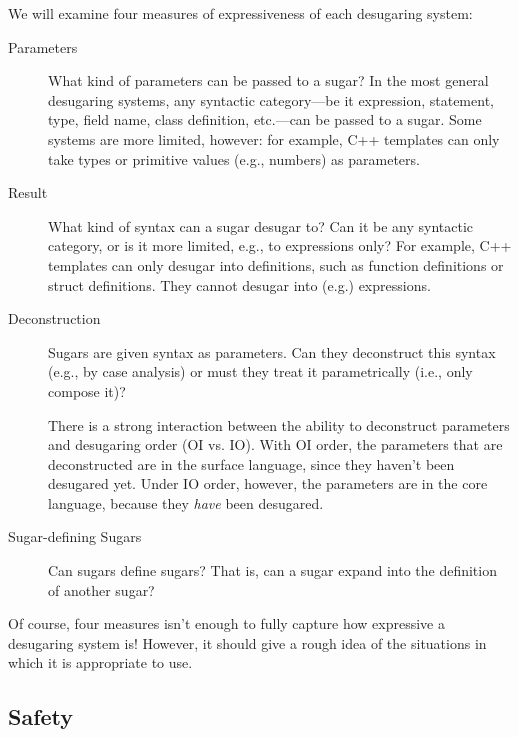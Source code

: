 We will examine four measures of expressiveness of each desugaring
system:
\begin{description}
\item[Parameters] What kind of parameters can be passed to a sugar? In
  the most general desugaring systems, any syntactic category---be it
  expression, statement, type, field name, class definition,
  etc.---can be passed to a sugar. Some systems are more limited,
  however: for example, C++ templates can only take types or primitive
  values (e.g., numbers) as parameters.
\item[Result] What kind of syntax can a sugar desugar to? Can it be
  any syntactic category, or is it more limited, e.g., to expressions
  only? For example, C++ templates can only desugar into definitions,
  such as function definitions or struct definitions. They cannot
  desugar into (e.g.) expressions.
\item[Deconstruction] Sugars are given syntax as parameters. Can they
  deconstruct this syntax (e.g., by case analysis) or must
  they treat it parametrically (i.e., only compose it)?

  There is a strong interaction between the ability to deconstruct
  parameters and desugaring order (OI vs. IO). With OI order, the
  parameters that are deconstructed are in the surface language, since
  they haven't been desugared yet. Under IO order, however, the
  parameters are in the core language, because they \emph{have} been
  desugared.
\item[Sugar-defining Sugars] Can sugars define sugars? That is, can a
  sugar expand into the definition of another sugar?
\end{description}
Of course, four measures isn't enough to fully capture how expressive
a desugaring system is! However, it should give a rough idea of the
situations in which it is appropriate to use.


\subsection{Safety}\label{sec:taxonomy-safety}

